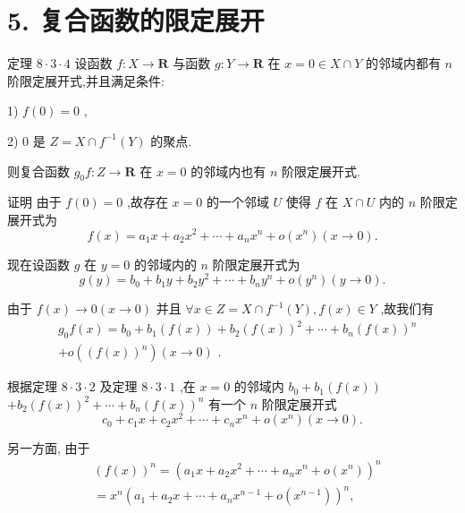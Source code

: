 \section*{5. 复合函数的限定展开}

定理 $8 \cdot  3 \cdot  4$ 设函数 $f : X \rightarrow  \mathbf{R}$ 与函数 $g : Y \rightarrow  \mathbf{R}$ 在 $x = 0 \in  X \cap  Y$ 的邻域内都有 $n$ 阶限定展开式,并且满足条件:

1) $f\left( 0\right)  = 0$ ,

2) 0 是 $Z = X \cap  {f}^{-1}\left( Y\right)$ 的聚点.

则复合函数 ${g}_{0}f : Z \rightarrow  \mathbf{R}$ 在 $x = 0$ 的邻域内也有 $n$ 阶限定展开式.

证明 由于 $f\left( 0\right)  = 0$ ,故存在 $x = 0$ 的一个邻域 $U$ 使得 $f$ 在 $X \cap  U$ 内的 $n$ 阶限定展开式为
$$f\left( x\right)  = {a}_{1}x + {a}_{2}{x}^{2} + \cdots  + {a}_{n}{x}^{n} + o\left( {x}^{n}\right) \left( {x \rightarrow  0}\right) .$$

现在设函数 $g$ 在 $y = 0$ 的邻域内的 $n$ 阶限定展开式为
$$g\left( y\right)  = {b}_{0} + {b}_{1}y + {b}_{2}{y}^{2} + \cdots  + {b}_{n}{y}^{n} + o\left( {y}^{n}\right) \left( {y \rightarrow  0}\right) .$$

由于 $f\left( x\right)  \rightarrow  0\left( {x \rightarrow  0}\right)$ 并且 $\forall x \in  Z = X \cap  {f}^{-1}\left( Y\right) ,f\left( x\right)  \in  Y$ ,故我们有
\begin{align*}
	&{g}_{0}f\left( x\right)  = {b}_{0} + {b}_{1}\left( {f\left( x\right) }\right)  + {b}_{2}{\left( f\left( x\right) \right) }^{2} + \cdots  + {b}_{n}{\left( f\left( x\right) \right) }^{n}\\
	&+ o\left( {\left( f\left( x\right) \right) }^{n}\right) \left( {x \rightarrow  0}\right) \text{ . }
\end{align*}

根据定理 $8 \cdot  3 \cdot  2$ 及定理 $8 \cdot  3 \cdot  1$ ,在 $x = 0$ 的邻域内 ${b}_{0} + {b}_{1}\left( {f\left( x\right) }\right)$  $+ {b}_{2}{\left( f\left( x\right) \right) }^{2} + \cdots  + {b}_{n}{\left( f\left( x\right) \right) }^{n}$ 有一个 $n$ 阶限定展开式
$${c}_{0} + {c}_{1}x + {c}_{2}{x}^{2} + \cdots  + {c}_{n}{x}^{n} + o\left( {x}^{n}\right) \left( {x \rightarrow  0}\right) .$$

另一方面, 由于
\begin{align*}
	&{\left( f\left( x\right) \right) }^{n} = {\left( {a}_{1}x + {a}_{2}{x}^{2} + \cdots  + {a}_{n}{x}^{n} + o\left( {x}^{n}\right) \right) }^{n}\\
	&= {x}^{n}{\left( {a}_{1} + {a}_{2}x + \cdots  + {a}_{n}{x}^{n - 1} + o\left( {x}^{n - 1}\right) \right) }^{n},
\end{align*}

